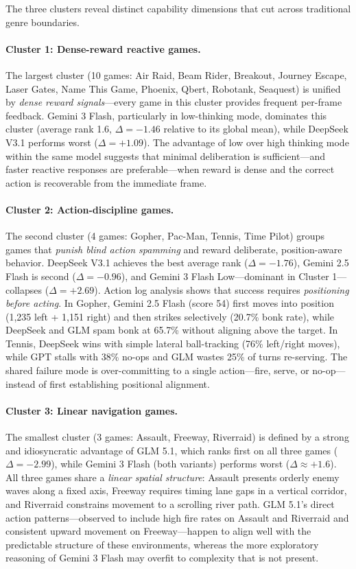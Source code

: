 The three clusters reveal distinct capability dimensions that cut across traditional genre boundaries.

\paragraph{Cluster 1: Dense-reward reactive games.}
The largest cluster (10 games: Air Raid, Beam Rider, Breakout, Journey Escape, Laser Gates,
Name This Game, Phoenix, Qbert, Robotank, Seaquest) is unified by \emph{dense reward signals}---every
game in this cluster provides frequent per-frame feedback.
Gemini 3 Flash, particularly in low-thinking mode, dominates this cluster (average rank 1.6,
$\Delta = -1.46$ relative to its global mean), while DeepSeek V3.1 performs worst
($\Delta = +1.09$).
The advantage of low over high thinking mode within the same model suggests that
minimal deliberation is sufficient---and faster reactive responses are preferable---when
reward is dense and the correct action is recoverable from the immediate frame.

\paragraph{Cluster 2: Action-discipline games.}
The second cluster (4 games: Gopher, Pac-Man, Tennis, Time Pilot) groups games that
\emph{punish blind action spamming} and reward deliberate, position-aware behavior.
DeepSeek V3.1 achieves the best average rank ($\Delta = -1.76$), Gemini 2.5 Flash is second
($\Delta = -0.96$), and Gemini 3 Flash Low---dominant in Cluster 1---collapses ($\Delta = +2.69$).
Action log analysis shows that success requires \emph{positioning before acting}.
In Gopher, Gemini 2.5 Flash (score 54) first moves into position (1,235 left + 1,151 right)
and then strikes selectively (20.7\% bonk rate), while DeepSeek and GLM spam bonk at 65.7\%
without aligning above the target.
In Tennis, DeepSeek wins with simple lateral ball-tracking (76\% left/right moves),
while GPT stalls with 38\% no-ops and GLM wastes 25\% of turns re-serving.
The shared failure mode is over-committing to a single action---fire, serve, or no-op---instead
of first establishing positional alignment.

\paragraph{Cluster 3: Linear navigation games.}
The smallest cluster (3 games: Assault, Freeway, Riverraid) is defined by a strong and
idiosyncratic advantage of GLM 5.1, which ranks first on all three games
($\Delta = -2.99$), while Gemini 3 Flash (both variants) performs worst ($\Delta \approx +1.6$).
All three games share a \emph{linear spatial structure}: Assault presents orderly enemy waves along
a fixed axis, Freeway requires timing lane gaps in a vertical corridor, and Riverraid constrains
movement to a scrolling river path.
GLM 5.1's direct action patterns---observed to include high fire rates on Assault and Riverraid and
consistent upward movement on Freeway---happen to align well with the predictable structure of these
environments, whereas the more exploratory reasoning of Gemini 3 Flash may overfit to
complexity that is not present.
